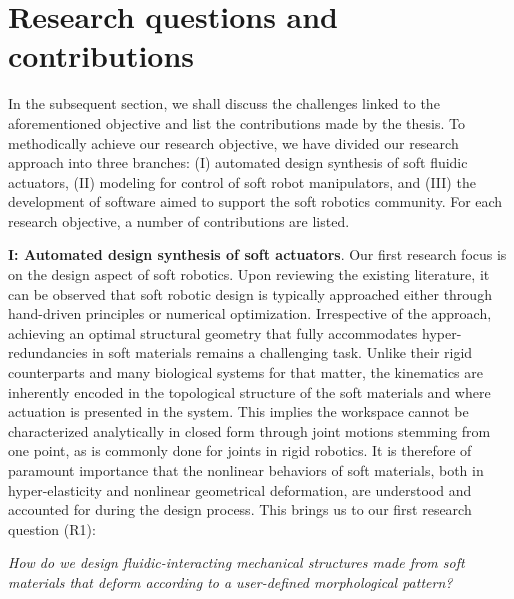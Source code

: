 \section{Research questions and contributions}
In the subsequent section, we shall discuss the challenges linked to the aforementioned objective and list the contributions made by the thesis. To methodically achieve our research objective, we have divided our research approach into three branches: (I) automated design synthesis of soft fluidic actuators, (II) modeling for control of soft robot manipulators, and (III) the development of software aimed to support the soft robotics community. For each research objective, a number of contributions are listed. \vspace{1mm}

\par \textbf{I: Automated design synthesis of soft actuators}. Our first research focus is on the design aspect of soft robotics. Upon reviewing the existing literature, it can be observed that soft robotic design is typically approached either through hand-driven principles or numerical optimization. Irrespective of the approach, achieving an optimal structural geometry that fully accommodates hyper-redundancies in soft materials remains a challenging task. Unlike their rigid counterparts and many biological systems for that matter, the kinematics are inherently encoded in the topological structure of the soft materials and where actuation is presented in the system. This implies the workspace cannot be characterized analytically in closed form through joint motions stemming from one point, as is commonly done for joints in rigid robotics. It is therefore of paramount importance that the nonlinear behaviors of soft materials, both in hyper-elasticity and nonlinear geometrical deformation, are understood and accounted for during the design process. This brings us to our first research question (R1):
%
\begin{center}
\textit{
How do we design fluidic-interacting mechanical structures made from soft materials that deform according to a user-defined morphological pattern?
}
\end{center}
%
